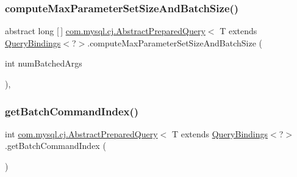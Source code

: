 \subsubsection{\texorpdfstring{compute\+Max\+Parameter\+Set\+Size\+And\+Batch\+Size()}{computeMaxParameterSetSizeAndBatchSize()}}
{\footnotesize\ttfamily abstract long \mbox{[}$\,$\mbox{]} \mbox{\hyperlink{classcom_1_1mysql_1_1cj_1_1_abstract_prepared_query}{com.\+mysql.\+cj.\+Abstract\+Prepared\+Query}}$<$ T extends \mbox{\hyperlink{interfacecom_1_1mysql_1_1cj_1_1_query_bindings}{Query\+Bindings}}$<$?$>$.compute\+Max\+Parameter\+Set\+Size\+And\+Batch\+Size (\begin{DoxyParamCaption}\item[{int}]{num\+Batched\+Args }\end{DoxyParamCaption})\hspace{0.3cm}{\ttfamily [abstract]}, {\ttfamily [protected]}}

\mbox{\label{classcom_1_1mysql_1_1cj_1_1_abstract_prepared_query_ab595548448d9b185687085386f5e5403}} 
\subsubsection{\texorpdfstring{get\+Batch\+Command\+Index()}{getBatchCommandIndex()}}
{\footnotesize\ttfamily int \mbox{\hyperlink{classcom_1_1mysql_1_1cj_1_1_abstract_prepared_query}{com.\+mysql.\+cj.\+Abstract\+Prepared\+Query}}$<$ T extends \mbox{\hyperlink{interfacecom_1_1mysql_1_1cj_1_1_query_bindings}{Query\+Bindings}}$<$?$>$.get\+Batch\+Command\+Index (\begin{DoxyParamCaption}{ }\end{DoxyParamCaption})}

\mbox{\label{classcom_1_1mysql_1_1cj_1_1_abstract_prepared_query_a91146df290c8444346a58138f507144e}} 
